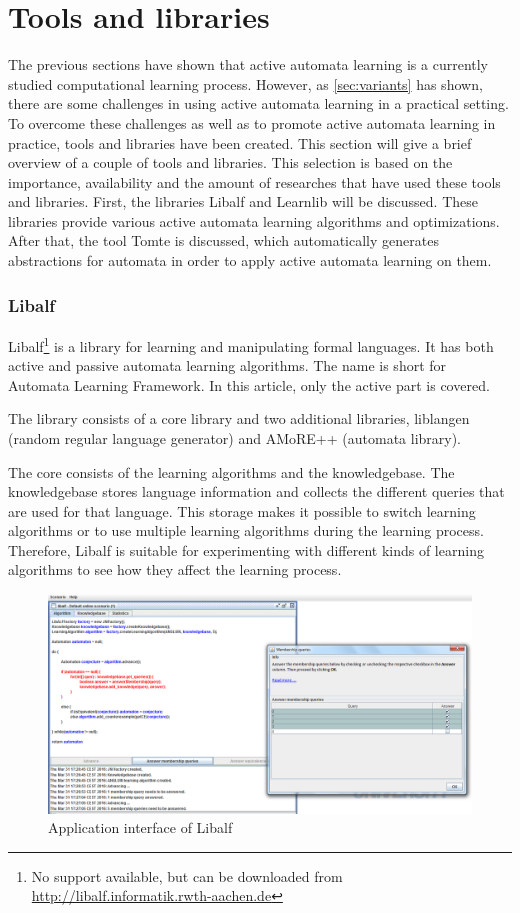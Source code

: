 \documentclass[multi,crop=false,class=article]{standalone}
\begin{document}
\section{Tools and libraries}
\label{sec:tools}
The previous sections have shown that active automata learning is a currently
studied computational learning process. However, as \cref{sec:variants} has
shown, there are some challenges in using active automata learning in a
practical setting. To overcome these challenges as well as to promote active
automata learning in practice, tools and libraries have been created. This
section will give a brief overview of a couple of tools and libraries. This
selection is based on the importance, availability and the amount of researches
that have used these tools and libraries. First, the libraries Libalf and
Learnlib will be discussed. These libraries provide various active automata
learning algorithms and optimizations. After that, the tool Tomte is discussed,
which automatically generates abstractions for automata in order to apply active
automata learning on them.


\subsubsection{Libalf}
\label{sssec:libalf}
Libalf\footnote{No support available, but can be downloaded from 
\url{http://libalf.informatik.rwth-aachen.de}} is a library for learning and 
manipulating formal languages. It has both active and passive automata learning 
algorithms. The name is short for Automata Learning Framework. In this article, 
only the active part is covered.

The library consists of a core library and two additional libraries, 
liblangen (random regular language generator) and AMoRE++ (automata library).

The core consists of the learning algorithms and the knowledgebase. The 
knowledgebase stores language information and collects the different queries 
that are used for that language. This storage makes it possible to switch 
learning algorithms or to use multiple learning algorithms during the learning 
process. Therefore, Libalf is suitable for experimenting with different kinds 
of learning algorithms to see how they affect the learning process. 

\begin{figure}[!ht]
	\includegraphics[width=\textwidth]{Tool_images/libalf_demo_interface.png}
	\caption{Application interface of Libalf}
	\label{fig:libalf_interface}
\end{figure}
\end{document}
